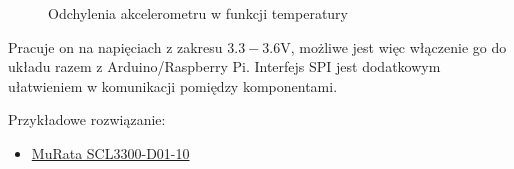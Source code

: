 \begin{figure}[H]
    \hfill
    \hfill
    \caption{Odchylenia akcelerometru w funkcji temperatury \cite{inclino}}
    \label{fig:inclino_temp}
\end{figure}

Pracuje on na napięciach z zakresu $3.3-3.6$V, możliwe jest więc włączenie go do układu razem z Arduino/Raspberry Pi. Interfejs SPI jest dodatkowym ułatwieniem w komunikacji pomiędzy komponentami.

Przykładowe rozwiązanie:
\begin{itemize}
    \item \href{https://www.mouser.pl/ProductDetail/Murata-Electronics/SCL3300-D01-10?qs=gZXFycFWdAOFydYBLsvu8Q%3D%3D&mgh=1&vip=1&gclid=Cj0KCQiA5NSdBhDfARIsALzs2ECEO9jDFShKG2lA_S2OoNgsOxEbMKKAJx_lWr7MB632r4TBB5kzGLAaAn6aEALw_wcB}{MuRata SCL3300-D01-10}
\end{itemize}